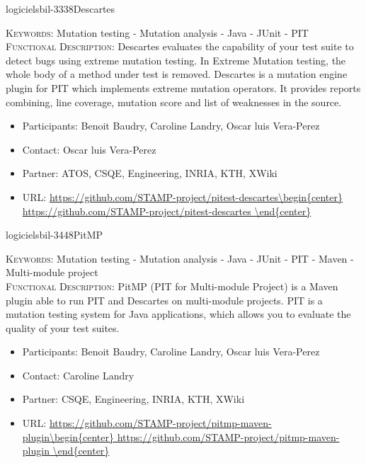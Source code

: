 \documentclass{ra2018}
\begin{document}
  \begin{module}{logiciels}{bil-3338}{Descartes}
	
	\textsc{Keywords:} Mutation testing - Mutation analysis - Java - JUnit - PIT \\ 
	
	
	
	
	\textsc{Functional Description:}  Descartes evaluates the capability of your test suite to detect bugs using extreme mutation testing. In Extreme Mutation testing, the whole body of a method under test is removed. Descartes is a mutation engine plugin for PIT which implements extreme mutation operators. It provides reports combining, line coverage, mutation score and list of weaknesses in the source.\\
	
	\begin{itemize}
		\item Participants: Benoit Baudry, Caroline Landry, Oscar luis Vera-Perez
		\item Contact: Oscar luis Vera-Perez
		\item Partner: ATOS, CSQE, Engineering, INRIA, KTH, XWiki
		\item URL: \url{https://github.com/STAMP-project/pitest-descartes\begin{center}
				https://github.com/STAMP-project/pitest-descartes
		\end{center}}
	\end{itemize}
\end{module}

\begin{module}{logiciels}{bil-3448}{PitMP}
	
	\textsc{Keywords:} Mutation testing - Mutation analysis - Java - JUnit - PIT - Maven - Multi-module project \\ 
	
	\textsc{Functional Description:}  PitMP (PIT for Multi-module Project) is a Maven plugin able to run PIT and Descartes on multi-module projects. PIT is a mutation testing system for Java applications, which allows you to evaluate the quality of your test suites.\\
	
	\begin{itemize}
		\item Participants: Benoit Baudry, Caroline Landry, Oscar luis Vera-Perez
		\item Contact: Caroline Landry
		\item Partner: CSQE, Engineering, INRIA, KTH, XWiki
		\item URL: \url{https://github.com/STAMP-project/pitmp-maven-plugin\begin{center}
				https://github.com/STAMP-project/pitmp-maven-plugin
		\end{center}}
	\end{itemize}
	
\end{module}
\end{document}
